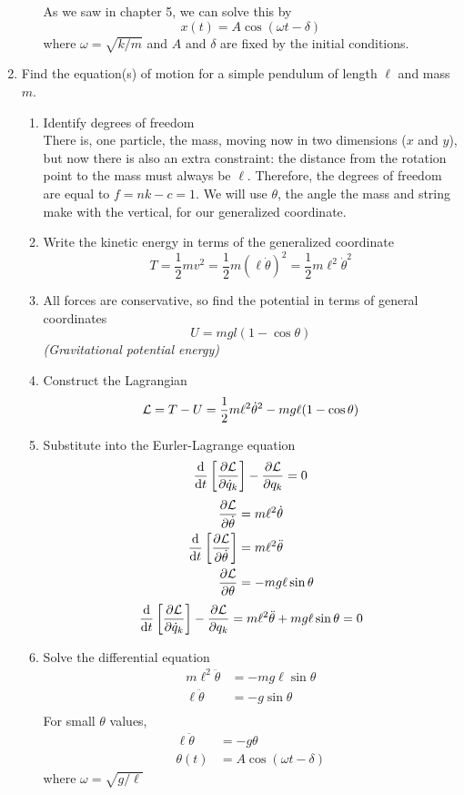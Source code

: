 \documentclass[a4paper]{article}
\begin{document}
\begin{enumerate}[label=\arabic*.]
\begin{enumerate}[label=\roman*.]
			As we saw in chapter 5, we can solve this by
			\[ x(t) = A\cos(\omega t - \delta) \]
			where $\omega = \sqrt{k/m}$ and $A$ and $\delta$ are
			fixed by the initial conditions.
		\end{enumerate}
	\item Find the equation(s) of motion for a simple pendulum of length
		$\ell$ and mass $m$.
	\begin{enumerate}[label=\roman*.]
		\item Identify degrees of freedom\\
			There is, one particle, the mass, moving
			now in two dimensions ($x$ and $y$), but now
			there is also an extra constraint: the distance
			from the rotation point to the mass must always
			be $\ell$. Therefore, the degrees of freedom
			are equal to $f=nk-c=1$. We will use $\theta$,
			the angle the mass and string make with the
			vertical, for our generalized coordinate.
		\item Write the kinetic energy in terms of the
			generalized coordinate
			\[ T = \frac{1}{2}mv^2 = \frac{1}{2}m
				(\ell\dot{\theta})^2=\frac{1}{2}
				m\ell^2\dot{\theta}^2 \]
		\item All forces are conservative, so find the
			potential in terms of general coordinates
			\[ U = mgl(1-\cos\theta) \]
			\textit{(Gravitational potential energy)}
		\item Construct the Lagrangian
			\[ \mathcal{L} = T-U = \frac{1}{2}m\ell^2\dot{\theta}^2
			-mg\ell(1-\cos\theta) \]
		\item Substitute into the Eurler-Lagrange equation
			\[
				\frac{\mathrm{d}}{\mathrm{d} t}\left[\frac{\partial \mathcal{L}}{\partial \dot{q}_k}
				\right] - \frac{\partial \mathcal{L}}{\partial q_k} = 0
			\]
			\begin{align*}
				\frac{\partial \mathcal{L}}{\partial \dot{\theta}}&=m\ell^2\dot{\theta}\\
				\frac{\mathrm{d}}{\mathrm{d} t}\left[\frac{\partial \mathcal{L}}{\partial \dot{\theta}}
					\right] &= m\ell^2\ddot{\theta}\\
				\frac{\partial \mathcal{L}}{\partial \theta} &= -mg\ell\sin\theta
			\end{align*}
			\[
				\frac{\mathrm{d}}{\mathrm{d} t}\left[\frac{\partial \mathcal{L}}{\partial \dot{q}_k}
				\right] - \frac{\partial \mathcal{L}}{\partial q_k} =
				m\ell^2\ddot{\theta}+mg\ell\sin\theta=0
			\]
		\item Solve the differential equation
			\begin{align*}
				m\ell^2\ddot{\theta} &= -mg\ell\sin\theta\\
				\ell\ddot{\theta} &= -g\sin\theta\\
			\end{align*}
			For small $\theta$ values,
			\begin{align*}
				\ell\ddot{\theta} &= -g\theta\\
				\theta(t) &= A\cos(\omega t-\delta)
			\end{align*}
			where $\omega = \sqrt{g/\ell}$
	\end{enumerate}
\end{enumerate}
\end{document}
